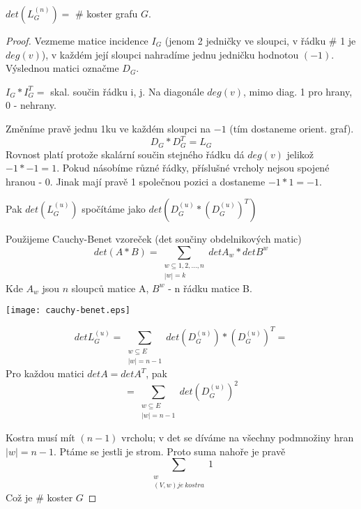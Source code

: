 \begin{theorem}
	$ det(L^{(n)}_G) = $ \# koster grafu $G$.
\end{theorem}
\begin{proof}
	Vezmeme matice incidence $ I_G $ (jenom 2 jedničky ve sloupci, v řádku \# 1 je $deg(v)$), v každém její sloupci nahradíme jednu jedničku hodnotou $(-1)$. Výslednou matici označme $D_G$.

	$ I_G * I_G^T = $ skal. součin řádku i, j. Na diagonále $deg(v)$, mimo diag. 1 pro hrany, 0 - nehrany.

	Změníme pravě jednu 1ku ve každém sloupci na $-1$ (tím dostaneme orient. graf).
		\[ D_G * D_G^T = L_G \]
		Rovnost platí protože skalární součin stejného řádku dá $deg(v)$ jelikož $ -1 * -1 = 1 $. Pokud násobíme různé řádky, příslušné vrcholy nejsou spojené hranou - 0. Jinak mají pravě 1 společnou pozici a dostaneme $-1 * 1 = -1$.

	Pak $det(L^{(u)}_G)$ spočítáme jako $det(D^{(u)}_G * (D^{(u)}_G)^T)$

	Použijeme Cauchy-Benet vzoreček (det součiny obdelnikových matic)
	\[ det(A*B) = \sum _{\substack{ w \subseteq {1,2, ..., n} \\ |w| = k}} det A_w * det B^w \]
	Kde $ A_w $ jsou $n$ sloupců matice A, $ B^w $ - n řádku matice B.

	\texttt{[image: cauchy-benet.eps]}

	\[ det L^{(u)}_G = \sum_{\substack{w \subseteq E \\ |w| = n-1}} det(D^{(u)}_G) * (D^{(u)}_G)^{T} = \]
	Pro každou matici $ det A = det A^T $, pak
	\[ = \sum_{\substack{w \subseteq E \\ |w| = n-1}} det(D^{(u)}_G)^2 \]

	Kostra musí mít $(n-1)$ vrcholu; v det se díváme na všechny podmnožiny hran $|w| = n - 1$.
	Ptáme se jestli je strom. Proto suma nahoře je pravě
	\[ \sum_{\substack{w \\ (V,w) je \ kostra}} 1 \]
	Což je \# koster $G$

\end{proof}
